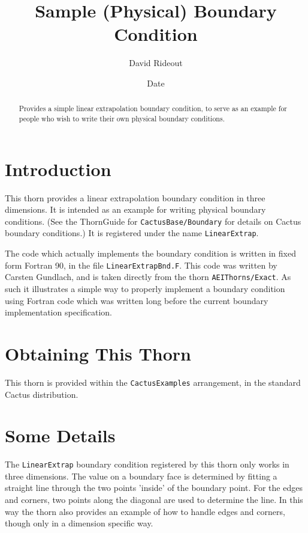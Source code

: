 \documentclass{article}
\begin{document}
\title{Sample (Physical) Boundary Condition}
\author{David Rideout}
\date{$ $Date$ $}

\maketitle


\begin{abstract}
Provides a simple linear extrapolation boundary condition, to serve as
an example for people who wish to write their own physical boundary conditions.
\end{abstract}


\section{Introduction}

This thorn provides a linear extrapolation boundary condition in three
dimensions.  It is intended as an example for writing physical
boundary conditions.  (See the ThornGuide for
\texttt{CactusBase/Boundary} for details on Cactus boundary
conditions.)  It is registered under the name \texttt{LinearExtrap}.

The code which actually implements the boundary condition is written
in fixed form Fortran 90, in the file \texttt{LinearExtrapBnd.F}.
This code was written by Carsten Gundlach, and is taken directly from
the thorn \texttt{AEIThorns/Exact}.  As such it illustrates a simple
way to properly implement a boundary condition using Fortran code
which was written long before the current boundary implementation
specification.

\section{Obtaining This Thorn}

This thorn is provided within the \texttt{CactusExamples} arrangement,
in the standard Cactus distribution.

\section{Some Details}

The \texttt{LinearExtrap} boundary condition registered by this thorn
only works in three dimensions.  The value on a boundary face is
determined by fitting a straight line through the two points 'inside'
of the boundary point.  For the edges and corners, two points along
the diagonal are used to determine the line.  In this way the thorn
also provides an example of how to handle edges and corners, though
only in a dimension specific way.
\end{document}
